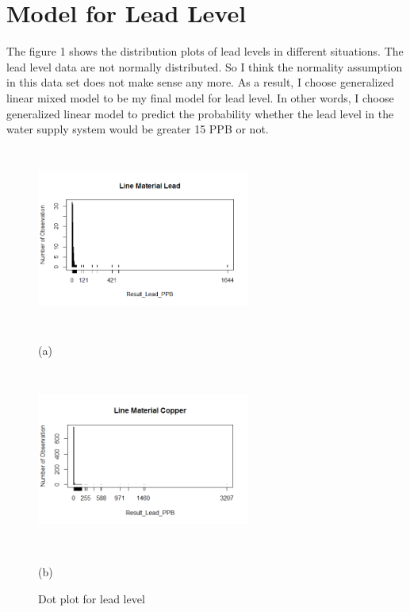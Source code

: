 \documentclass[letterpaper,12pt]{article}
\newcommand{\sihao}{\fontsize{14pt}{\baselineskip}\selectfont}       %
\begin{document}
\section*{\sihao Model for Lead Level}

The figure 1 shows the distribution plots of lead levels in different situations. The lead level data are not normally distributed. So I think the normality assumption in this data set does not make sense any more. As a result, I choose generalized linear mixed model to be my final model for lead level. In other words, I choose generalized linear model to predict the probability whether the lead level in the water supply system would be greater 15 PPB or not.
\begin{center}
\begin{figure}[h]
\begin{minipage}{0.48\linewidth}
  \centerline{\includegraphics[width=7.0cm, height = 6cm]{Em_dis_Lead.png}}
  \centerline{(a)}
\end{minipage}
\hfill
\begin{minipage}{.48\linewidth}
  \centerline{\includegraphics[width=7.0cm, height = 6cm]{Em_dis_Copper.png}}
  \centerline{(b)}
\end{minipage}
\vfill
\caption{Dot plot for lead level}
\label{fig:res}
\end{figure}
\end{center}
\end{document}
